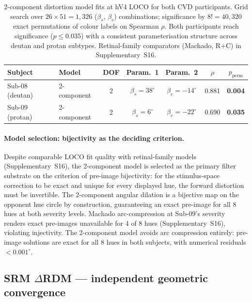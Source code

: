 \begin{table}[tb]
  \caption{2-component distortion model fits at hV4 LOCO for both CVD
  participants. Grid search over $26 \times 51 = 1{,}326$ ($\beta_s$,
  $\beta_c$) combinations; significance by $8! = 40{,}320$ exact
  permutations of colour labels on Spearman $\rho$. Both participants
  reach significance ($p \leq 0.035$) with a consistent parameterisation
  structure across deutan and protan subtypes. Retinal-family
  comparators (Machado, R+C) in Supplementary~S16.}
  \label{tab:main}
  \centering
  \small
  \begin{tabular}{llccccc}
    \toprule
    Subject & Model & DOF &
    Param.\ 1 & Param.\ 2 &
    $\rho$ & $p_{\text{perm}}$ \\
    \midrule
    Sub-08 (deutan) & 2-component & 2 & $\beta_s = 38^\circ$ & $\beta_c = -14^\circ$ & 0.881 & \textbf{0.004} \\
    Sub-09 (protan) & 2-component & 2 & $\beta_s =  6^\circ$ & $\beta_c = -22^\circ$ & 0.690 & \textbf{0.035} \\
    \bottomrule
  \end{tabular}
\end{table}

\paragraph{Model selection: bijectivity as the deciding criterion.}
Despite comparable LOCO fit quality with retinal-family models
(Supplementary~S16), the 2-component model is selected as the primary
filter substrate on the criterion of pre-image bijectivity: for the
stimulus-space correction to be exact and unique for every displayed hue,
the forward distortion must be invertible. The 2-component angular dilation is a
bijective map on the opponent hue circle by construction, guaranteeing an
exact pre-image for all 8 hues at both severity levels. Machado
arc-compression at Sub-09's severity renders exact pre-images unavailable
for 4 of 8 hues (Supplementary~S16), violating injectivity.
The 2-component model avoids arc compression entirely: pre-image solutions
are exact for all 8 hues in both subjects, with numerical residuals
$< 0.001^\circ$.

\subsection{SRM $\Delta$RDM --- independent geometric convergence}
\label{sec:results:srm}

